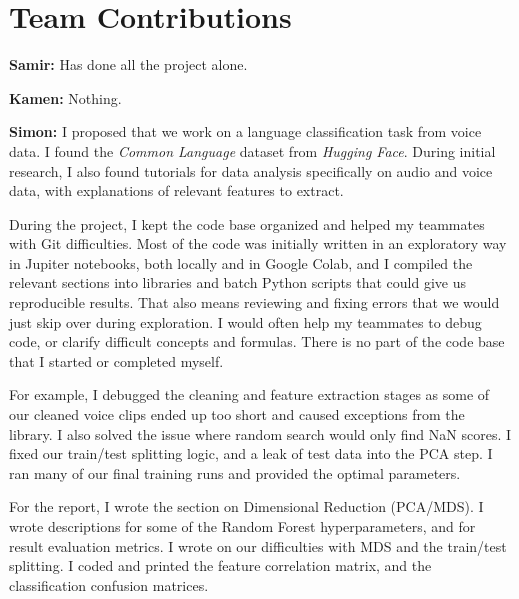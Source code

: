 \documentclass[twocolumn]{article}
\begin{document}
\section{Team Contributions}
\begin{flushend}
\textbf{Samir:} Has done all the project alone.

\textbf{Kamen:} Nothing.

\textbf{Simon:}
I proposed that we work on a language classification task from voice data. I found the \textit{Common Language} dataset from \textit{Hugging Face}. During initial research, I also found tutorials for data analysis specifically on audio and voice data, with explanations of relevant features to extract.

During the project, I kept the code base organized and helped my teammates with Git difficulties. Most of the code was initially written in an exploratory way in Jupiter notebooks, both locally and in Google Colab, and I compiled the relevant sections into libraries and batch Python scripts that could give us reproducible results. That also means reviewing and fixing errors that we would just skip over during exploration. I would often help my teammates to debug code, or clarify difficult concepts and formulas. There is no part of the code base that I started or completed myself.

For example, I debugged the cleaning and feature extraction stages as some of our cleaned voice clips ended up too short and caused exceptions from the library. I also solved the issue where random search would only find NaN scores. I fixed our train/test splitting logic, and a leak of test data into the PCA step. I ran many of our final training runs and provided the optimal parameters.

For the report, I wrote the section on Dimensional Reduction (PCA/MDS). I wrote descriptions for some of the Random Forest hyperparameters, and for result evaluation metrics. I wrote on our difficulties with MDS and the train/test splitting. I coded and printed the feature correlation matrix, and the classification confusion matrices.
\end{flushend}
\end{document}
